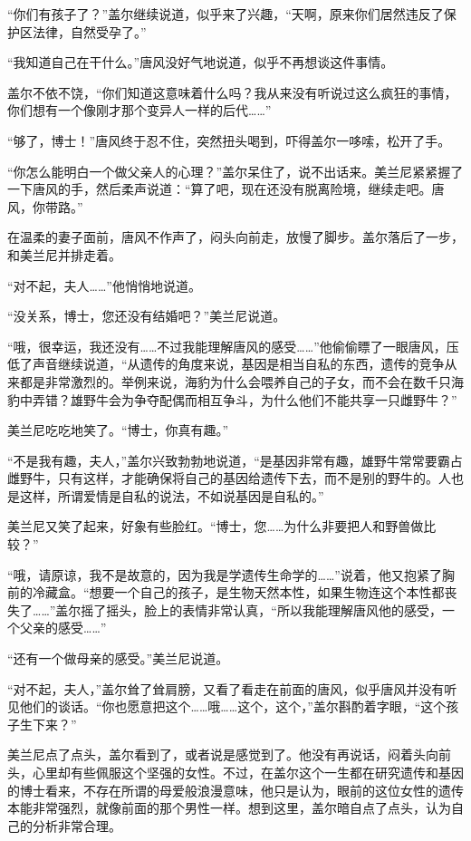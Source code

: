 “你们有孩子了？”盖尔继续说道，似乎来了兴趣，“天啊，原来你们居然违反了保护区法律，自然受孕了。”

“我知道自己在干什么。”唐风没好气地说道，似乎不再想谈这件事情。

盖尔不依不饶，“你们知道这意味着什么吗？我从来没有听说过这么疯狂的事情，你们想有一个像刚才那个变异人一样的后代……”

“够了，博士！”唐风终于忍不住，突然扭头喝到，吓得盖尔一哆嗦，松开了手。

“你怎么能明白一个做父亲人的心理？”盖尔呆住了，说不出话来。美兰尼紧紧握了一下唐风的手，然后柔声说道：“算了吧，现在还没有脱离险境，继续走吧。唐风，你带路。”

在温柔的妻子面前，唐风不作声了，闷头向前走，放慢了脚步。盖尔落后了一步，和美兰尼并排走着。

“对不起，夫人……”他悄悄地说道。

“没关系，博士，您还没有结婚吧？”美兰尼说道。

“哦，很幸运，我还没有……不过我能理解唐风的感受……”他偷偷瞟了一眼唐风，压低了声音继续说道，“从遗传的角度来说，基因是相当自私的东西，遗传的竞争从来都是非常激烈的。举例来说，海豹为什么会喂养自己的子女，而不会在数千只海豹中弄错？雄野牛会为争夺配偶而相互争斗，为什么他们不能共享一只雌野牛？”

美兰尼吃吃地笑了。“博士，你真有趣。”

“不是我有趣，夫人，”盖尔兴致勃勃地说道，“是基因非常有趣，雄野牛常常要霸占雌野牛，只有这样，才能确保将自己的基因给遗传下去，而不是别的野牛的。人也是这样，所谓爱情是自私的说法，不如说基因是自私的。”

美兰尼又笑了起来，好象有些脸红。“博士，您……为什么非要把人和野兽做比较？”

“哦，请原谅，我不是故意的，因为我是学遗传生命学的……”说着，他又抱紧了胸前的冷藏盒。“想要一个自己的孩子，是生物天然本性，如果生物连这个本性都丧失了……”盖尔摇了摇头，脸上的表情非常认真，“所以我能理解唐风他的感受，一个父亲的感受……”

“还有一个做母亲的感受。”美兰尼说道。

“对不起，夫人，”盖尔耸了耸肩膀，又看了看走在前面的唐风，似乎唐风并没有听见他们的谈话。“你也愿意把这个……哦……这个，这个，”盖尔斟酌着字眼，“这个孩子生下来？”

美兰尼点了点头，盖尔看到了，或者说是感觉到了。他没有再说话，闷着头向前头，心里却有些佩服这个坚强的女性。不过，在盖尔这个一生都在研究遗传和基因的博士看来，不存在所谓的母爱般浪漫意味，他只是认为，眼前的这位女性的遗传本能非常强烈，就像前面的那个男性一样。想到这里，盖尔暗自点了点头，认为自己的分析非常合理。

